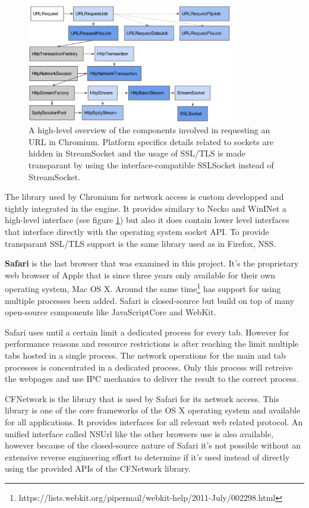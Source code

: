 \begin{figure}[h]
    \centering
    \includegraphics[width=9cm]{Images/Chrome_network.png}
    \caption{A high-level overview of the components involved in requesting an URL in Chromium. Platform specifics details related to sockets are hidden in StreamSocket and the usage of SSL/TLS is made transparant by using the interface-compatible SSLSocket instead of StreamSocket. \cite{http://www.chromium.org/developers/design-documents/network-stack}}
    \label{fig:chrome_network}
\end{figure}

The library used by Chromium for network access is custom developped and tightly integrated in the engine. It provides similary to Necko and WinINet a high-level interface (see figure \ref{fig:chrome_network}) but also it does contain lower level interfaces that interface directly with the operating system socket API. To provide transparant SSL/TLS support is the same library used as in Firefox, NSS.

\textbf{Safari} is the last browser that was examined in this project. It's the proprietary web browser of Apple that is since three years only available for their own operating system, Mac OS X. Around the same time\footnote{https://lists.webkit.org/pipermail/webkit-help/2011-July/002298.html} has support for using multiple processes been added. Safari is closed-source but build on top of many open-source components like JavaScriptCore and WebKit.

Safari uses until a certain limit a dedicated process for every tab. However for performance reasons and resource restrictions is after reaching the limit multiple tabs hosted in a single process. The network operations for the main and tab processes is concentrated in a dedicated process. Only this process will retreive the webpages and use IPC mechanics to deliver the result to the correct process. 

CFNetwork is the library that is used by Safari for its network access. This library is one of the core frameworks of the OS X operating system and available for all applications. It provides interfaces for all relevant web related protocol. An unified interface called NSUrl like the other browsers use is also available, however because of the closed-source nature of Safari it's not possible without an extensive reverse engineering effort to determine if it's used instead of directly using the provided APIs of the CFNetwork library.

